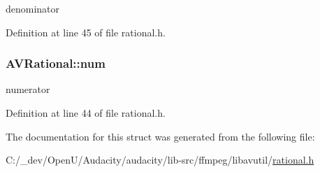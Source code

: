denominator 



Definition at line 45 of file rational.\+h.

\subsubsection[{\texorpdfstring{num}{num}}]{ A\+V\+Rational\+::num}\hypertarget{struct_a_v_rational_ae9a98c10a301c5e937095105b6f0fdb9}{}\label{struct_a_v_rational_ae9a98c10a301c5e937095105b6f0fdb9}


numerator 



Definition at line 44 of file rational.\+h.



The documentation for this struct was generated from the following file\+:\begin{DoxyCompactItemize}
\item 
C\+:/\+\_\+dev/\+Open\+U/\+Audacity/audacity/lib-\/src/ffmpeg/libavutil/\hyperlink{rational_8h}{rational.\+h}\end{DoxyCompactItemize}
